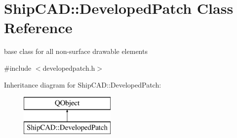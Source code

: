 \hypertarget{classShipCAD_1_1DevelopedPatch}{}\section{Ship\+C\+AD\+:\+:Developed\+Patch Class Reference}
\label{classShipCAD_1_1DevelopedPatch}


base class for all non-\/surface drawable elements  




{\ttfamily \#include $<$developedpatch.\+h$>$}

Inheritance diagram for Ship\+C\+AD\+:\+:Developed\+Patch\+:\begin{figure}[H]
\begin{center}
\leavevmode
\includegraphics[height=2.000000cm]{classShipCAD_1_1DevelopedPatch}
\end{center}
\end{figure}
